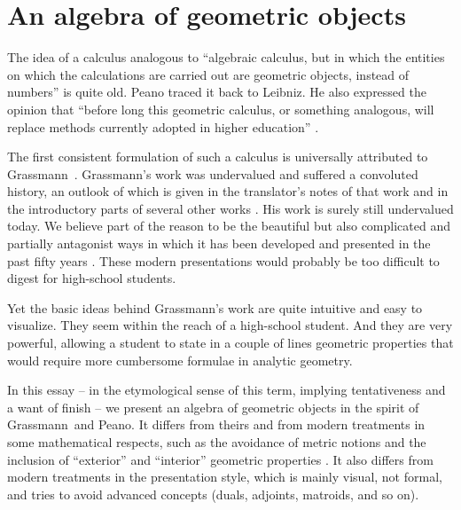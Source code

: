 \documentclass[\ifafour a4paper,12pt,\else a5paper,10pt,\fi%
onecolumn,oneside,article,%
british%
]{memoir}
\theoremstyle{remark}
\theoremstyle{innote}
\newcommand*{\citep}{\parencites}
\newcommand*{\citey}{\parencites*}
\renewcommand*{\|}{\nonscript\,\vert\nonscript\;\mathopen{}}
\newcommand*{\chap}{ch.}%
\newcommand*{\gm}{Grassmann}
\begin{document}
\section{An algebra of geometric objects}
\label{sec:algebra_geometry}

The idea of a calculus analogous to \enquote{algebraic calculus, but in
  which the entities on which the calculations are carried out are
  geometric objects, instead of numbers} \citep[\chap~I, our
transl.]{peano1888} is quite old. Peano traced it back to Leibniz. He also
expressed the opinion that \enquote{before long this geometric calculus, or
  something analogous, will replace methods currently adopted in higher
  education} \citep[Prefazione, our transl.]{peano1888}.

The first consistent formulation of such a calculus is universally
attributed to \gm\ \citey{grassmann1844_r1878,grassmann1862}. Grassmann's
work was undervalued and suffered a convoluted history, an outlook of which
is given in the translator's notes of that work
\citep{grassmann1844_t1995,grassmann1862_t2000} and in the introductory
parts of several other works
\citep{peano1888,barnabeietal1985,crapo2009,browne2012,vargas2016}. His
work is surely still undervalued today. We believe part of the reason to be
the beautiful but also complicated and partially antagonist ways in which
it has been developed and presented in the past fifty years \citep[examples
are][]{hestenes1968,hestenesetal1984_r1987,barnabeietal1985,dorstetal2002,li2008,crapo2009,brinietal2011,dorstetal2011,gunn2011,browne2012,gonzalezcalvet2016,vargas2016}.
These modern presentations would probably be too difficult to digest for
high-school students.

Yet the basic ideas behind Grassmann's work are quite intuitive and easy to
visualize. They seem within the reach of a high-school student. And they
are very powerful, allowing a student to state in a couple of lines
geometric properties that would require more cumbersome formulae in
analytic geometry.


In this essay -- in the etymological sense of this term, implying
tentativeness and a want of finish -- we present an algebra of geometric
objects in the spirit of \gm\ and Peano. It differs from theirs and from
modern treatments in some mathematical respects, such as the avoidance of
metric notions and the inclusion of \enquote{exterior} and
\enquote{interior} geometric properties
\citep{veblenetal1932,schoutenetal1940,schouten1951_r1989,burke1983,burke1985_r1987,burke1995,bossavit1994_r2002,bossavit2003b}.
It also differs from modern treatments in the presentation style, which is
mainly visual, not formal, and tries to avoid advanced concepts (duals,
adjoints, matroids, and so on).
\end{document}
